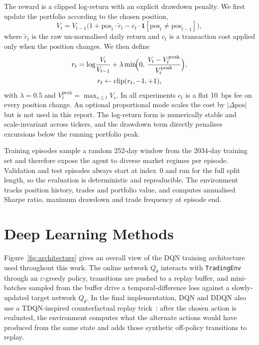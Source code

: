 \documentclass[11pt,twocolumn]{article}
\begin{document}
The reward is a clipped log-return with an explicit drawdown penalty. We first update the portfolio according to the chosen position,
\begin{equation}
  V_t = V_{t-1}\bigl(1 + \text{pos}_t \cdot \tilde r_t - c_t \cdot \mathbf{1}[\text{pos}_t \neq \text{pos}_{t-1}]\bigr),
\end{equation}
where $\tilde r_t$ is the raw un-normalised daily return and $c_t$ is a transaction cost applied only when the position changes. We then define
\begin{multline}
  r_t = \log\!\frac{V_t}{V_{t-1}} + \lambda \min\!\Bigl(0,\, \frac{V_t - V_t^{\text{peak}}}{V_t^{\text{peak}}}\Bigr),\\
  r_t \leftarrow \mathrm{clip}(r_t, -1, +1),
  \label{eq:reward}
\end{multline}
with $\lambda = 0.5$ and $V_t^{\text{peak}} = \max_{s \le t} V_s$. In all experiments $c_t$ is a flat 10~bps fee on every position change. An optional proportional mode scales the cost by $|\Delta\text{pos}|$ but is not used in this report. The log-return form is numerically stable and scale-invariant across tickers, and the drawdown term directly penalises excursions below the running portfolio peak.

Training episodes sample a random 252-day window from the 2034-day training set and therefore expose the agent to diverse market regimes per episode. Validation and test episodes always start at index~0 and run for the full split length, so the evaluation is deterministic and reproducible. The environment tracks position history, trades and portfolio value, and computes annualised Sharpe ratio, maximum drawdown and trade frequency at episode end.

\section{Deep Learning Methods}

Figure~\ref{fig:architecture} gives an overall view of the DQN training architecture used throughout this work. The online network $Q_\theta$ interacts with \texttt{TradingEnv} through an $\varepsilon$-greedy policy, transitions are pushed to a replay buffer, and mini-batches sampled from the buffer drive a temporal-difference loss against a slowly-updated target network $Q_{\bar\theta}$. In the final implementation, DQN and DDQN also use a TDQN-inspired counterfactual replay trick~\cite{theate2021}: after the chosen action is evaluated, the environment computes what the alternate actions would have produced from the same state and adds those synthetic off-policy transitions to replay.
\end{document}
